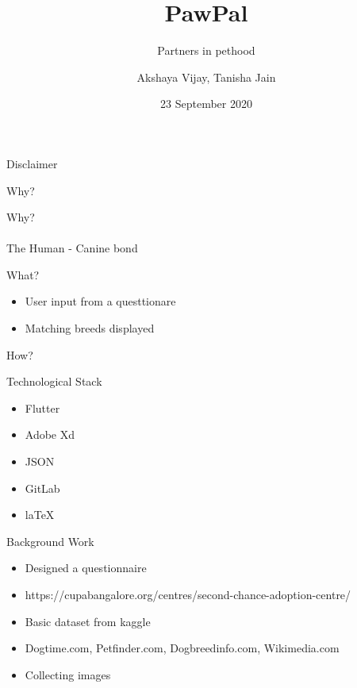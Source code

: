 \documentclass[14pt]{beamer}
\title[Pawpal]{PawPal}
\subtitle[Partners of pethood]{Partners in pethood}
\author[Team 42]{Akshaya Vijay, Tanisha Jain}
\date{23 September 2020}
\begin{document}
\begin{frame}
    \titlepage
\end{frame}

\begin{frame}[standout]
    Disclaimer 
\end{frame}

\begin{frame}[standout]
   Why?
\end{frame}

\begin{frame}[standout]
   Why?
   \\ \\\alert{The Human - Canine bond}
\end{frame}

\begin{frame}[standout]
   What?
\end{frame}

\begin{frame}
    \begin{itemize}
       
        \item User input from a questtionare
        \item Matching breeds displayed
    \end{itemize}
\end{frame}

\begin{frame}[standout]
   How?
\end{frame}

\begin{frame}{Technological Stack}
    \begin{itemize}
        \item Flutter
        \item Adobe Xd
        \item JSON
        \item GitLab
        \item laTeX
    \end{itemize}
\end{frame}

\begin{frame}{Background Work}
    \begin{itemize}
        \item Designed a questionnaire 
        \item https://cupabangalore.org/centres/second-chance-adoption-centre/
        \item Basic dataset from kaggle
        \item Dogtime.com, Petfinder.com, Dogbreedinfo.com, Wikimedia.com
        \item Collecting images 

    \end{itemize}
\end{frame}
\end{document}
